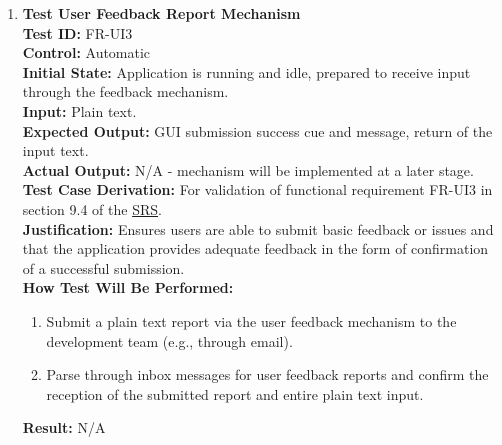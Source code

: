 \documentclass[12pt, titlepage]{article}
\begin{document}
\begin{enumerate}
    \item \textbf{Test User Feedback Report Mechanism} \\
      \newline
      \textbf{Test ID:} FR-UI3 \\
      \textbf{Control:} Automatic \\
      \textbf{Initial State:} Application is running and idle, prepared to receive input through the feedback mechanism. \\
      \textbf{Input:} Plain text. \\
      \textbf{Expected Output:} GUI submission success cue and message, return of the input text. \\
      \textbf{Actual Output:} N/A - mechanism will be implemented at a later stage. \\
      \textbf{Test Case Derivation:} For validation of functional requirement FR-UI3 in section 9.4 of the 
      \href{https://github.com/emilyperica/ScoreGen/blob/main/docs/SRS-Volere/SRS.pdf}{SRS}. \\
      \textbf{Justification:} Ensures users are able to submit basic feedback or issues and that the application provides adequate
      feedback in the form of confirmation of a successful submission.\\
      \textbf{How Test Will Be Performed:}
      \begin{enumerate}
          \item Submit a plain text report via the user feedback mechanism to the development team (e.g., through email).
          \item Parse through inbox messages for user feedback reports and confirm the reception of the submitted report and 
          entire plain text input.
      \end{enumerate}
      \textbf{Result:} N/A
  \end{enumerate}
\end{document}
